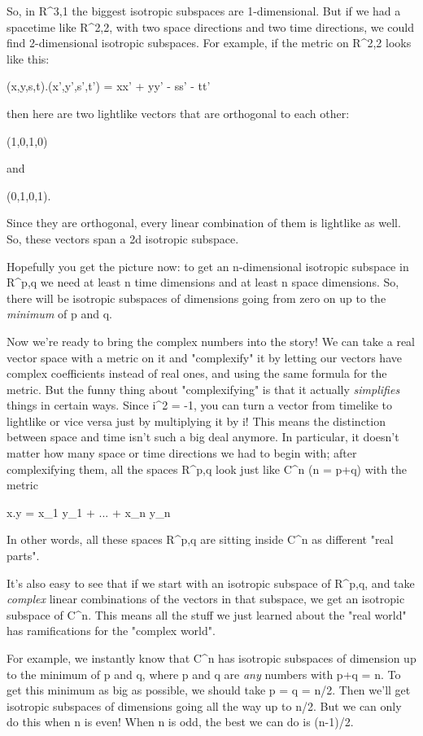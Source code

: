 So, in R^{3,1} the biggest isotropic subspaces are 1-dimensional.
But if we had a spacetime like R^{2,2}, with two space directions
and two time directions, we could find 2-dimensional isotropic subspaces.
For example, if the metric on R^{2,2} looks like this:


(x,y,s,t).(x',y',s',t') = xx' + yy' - ss' - tt'


then here are two lightlike vectors that are orthogonal to each
other:


(1,0,1,0)


and


(0,1,0,1).


Since they are orthogonal, every linear combination of them is
lightlike as well.   So, these vectors span a 2d isotropic subspace.


Hopefully you get the picture now: to get an n-dimensional isotropic
subspace in R^{p,q} we need at least n time dimensions and at least
n space dimensions.  So, there will be isotropic subspaces of dimensions
going from zero on up to the \emph{minimum} of p and q.


Now we're ready to bring the complex numbers into the story!
We can take a real vector space with a metric on it and "complexify"
it by letting our vectors have complex coefficients instead of real
ones, and using the same formula for the metric.  But the funny thing 
about "complexifying" is that it actually \emph{simplifies} things in 
certain ways.  Since i^{2} = -1, you can turn a vector from timelike
to lightlike or vice versa just by multiplying it by i!  This means
the distinction between space and time isn't such a big deal anymore.
In particular, it doesn't matter how many space or time directions we 
had to begin with; after complexifying them, all the spaces R^{p,q} 
look just like C^{n} (n = p+q) with the metric 


x.y = x_{1} y_{1} + ... + x_{n} y_{n}

In other words, all these spaces R^{p,q} are sitting inside 
C^{n} as different "real parts". 


It's also easy to see that if we start with an isotropic subspace of
R^{p,q}, and take \emph{complex} linear combinations of the
vectors in that subspace, we get an isotropic subspace of C^{n}.
This means all the stuff we just learned about the "real world" has
ramifications for the "complex world".


For example, we instantly know that C^{n} has isotropic subspaces of 
dimension up to the minimum of p and q, where p and q are \emph{any}
numbers with p+q = n.  To get this minimum as big as possible, we should
take p = q = n/2.  Then we'll get isotropic subspaces of dimensions
going all the way up to n/2.  But we can only do this when n is even!  
When n is odd, the best we can do is (n-1)/2.


